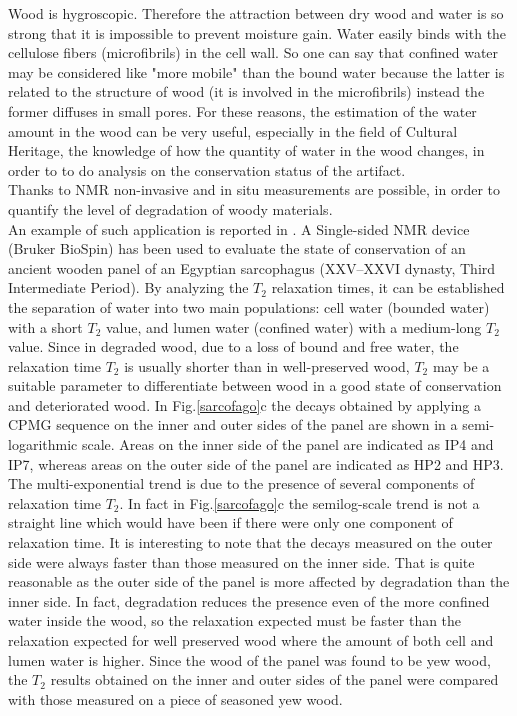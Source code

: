 \documentclass[a4paper,11pt]{report}
\begin{document}
Wood is hygroscopic. Therefore the attraction between dry wood and water is so strong that it is impossible to prevent moisture gain. Water easily binds with the cellulose fibers (microfibrils) in the cell wall.  So one can say that confined water may be considered like "more mobile" than the bound water because the latter is related to the structure of wood (it is involved in the microfibrils)  instead the former diffuses in small pores. For these reasons, the estimation of the water amount in the wood can be very useful, especially in the field of Cultural Heritage, the knowledge of how the quantity of water in the wood changes, in order to to do analysis on the conservation status of the artifact. \\
Thanks to NMR non-invasive and in situ measurements are possible, in order to quantify the level of degradation of woody materials.\\
An example of such application is reported in \cite{trewood}. A Single-sided NMR device (Bruker BioSpin) has been used to evaluate the state of conservation of an ancient wooden panel of an Egyptian sarcophagus (XXV–XXVI dynasty, Third Intermediate Period). 
By analyzing the $T_2$ relaxation times, it can be established the separation of water into two main populations: cell water (bounded water) with a short $T_2$ value,  and lumen water (confined water) with a medium-long $T_2$ value\cite{trewood}. Since in degraded wood, due to a loss of bound and free water, the relaxation time $T_2$ is usually shorter than in well-preserved wood,  $T_2$ may be a suitable parameter to differentiate between wood in a good state of conservation and deteriorated wood.
In Fig.\ref{sarcofago}c the decays obtained by applying a CPMG sequence on the inner and outer sides of the panel are shown in a semi-logarithmic scale. Areas on the inner side of the panel are indicated as IP4 and IP7, whereas areas on the outer side of the panel are indicated as HP2 and HP3. \\
The multi-exponential trend is due to the presence of several components of relaxation time $T_2$. In fact in Fig.\ref{sarcofago}c the semilog-scale trend is not a straight line which would have been if there were only one component of relaxation time. It is interesting to note that the decays measured on the outer side were always faster than those measured on the inner side. That is quite reasonable as the outer side of the panel is more affected by degradation than the inner side. In fact, degradation reduces the presence even of the more confined water inside the wood, so the relaxation expected must be faster than the relaxation expected for well preserved wood where the amount of both cell and lumen water is higher. Since the wood of the panel was found to be yew wood, the $T_2$ results obtained on the inner and outer sides of the panel were compared with those measured on a piece of seasoned yew wood\cite{trewood}.
\end{document}
